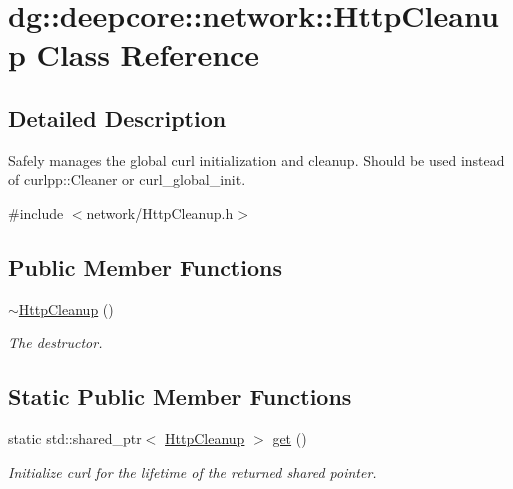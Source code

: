 \hypertarget{classdg_1_1deepcore_1_1network_1_1_http_cleanup}{}\section{dg\+:\+:deepcore\+:\+:network\+:\+:Http\+Cleanup Class Reference}
\label{classdg_1_1deepcore_1_1network_1_1_http_cleanup}


\subsection{Detailed Description}
Safely manages the global curl initialization and cleanup. Should be used instead of curlpp\+::\+Cleaner or curl\+\_\+global\+\_\+init. 

{\ttfamily \#include $<$network/\+Http\+Cleanup.\+h$>$}

\subsection*{Public Member Functions}
\begin{DoxyCompactItemize}
\item 
\hyperlink{group___network_module_gac517b1ec291e0fdcef96e8e7af54eb1d}{$\sim$\+Http\+Cleanup} ()
\begin{DoxyCompactList}\small\item\em The destructor. \end{DoxyCompactList}\end{DoxyCompactItemize}
\subsection*{Static Public Member Functions}
\begin{DoxyCompactItemize}
\item 
static std\+::shared\+\_\+ptr$<$ \hyperlink{classdg_1_1deepcore_1_1network_1_1_http_cleanup}{Http\+Cleanup} $>$ \hyperlink{group___network_module_ga039c8cd2070cc244714a28bdeddab074}{get} ()
\begin{DoxyCompactList}\small\item\em Initialize curl for the lifetime of the returned shared pointer. \end{DoxyCompactList}\end{DoxyCompactItemize}
